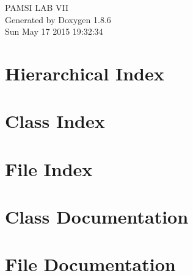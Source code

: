 \documentclass[twoside]{book}
\newcommand{\clearemptydoublepage}{%
  \newpage{\pagestyle{empty}\cleardoublepage}%
}
\begin{document}
\hypersetup{pageanchor=false}
\begin{titlepage}
\vspace*{7cm}
\begin{center}%
{\Large P\-A\-M\-S\-I L\-A\-B V\-I\-I }\\
\vspace*{1cm}
{\large Generated by Doxygen 1.8.6}\\
\vspace*{0.5cm}
{\small Sun May 17 2015 19:32:34}\\
\end{center}
\end{titlepage}
\clearemptydoublepage
\tableofcontents
\clearemptydoublepage
{}
\hypersetup{pageanchor=true}

\chapter{Hierarchical Index}

\chapter{Class Index}

\chapter{File Index}

\chapter{Class Documentation}
















\chapter{File Documentation}




















\newpage
{}
{}
\printindex
\end{document}

